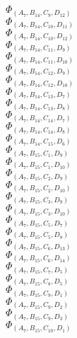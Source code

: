 \documentclass[14pt]{article}
\begin{document}
    $\Phi_{({A}_{7}, {B}_{14}, {C}_{9}, {D}_{12})}$ \\ 
    $\Phi_{({A}_{7}, {B}_{14}, {C}_{10}, {D}_{11})}$ \\ 
    $\Phi_{({A}_{7}, {B}_{14}, {C}_{10}, {D}_{12})}$ \\ 
    $\Phi_{({A}_{7}, {B}_{14}, {C}_{11}, {D}_{9})}$ \\ 
    $\Phi_{({A}_{7}, {B}_{14}, {C}_{11}, {D}_{10})}$ \\ 
    $\Phi_{({A}_{7}, {B}_{14}, {C}_{12}, {D}_{9})}$ \\ 
    $\Phi_{({A}_{7}, {B}_{14}, {C}_{12}, {D}_{10})}$ \\ 
    $\Phi_{({A}_{7}, {B}_{14}, {C}_{13}, {D}_{7})}$ \\ 
    $\Phi_{({A}_{7}, {B}_{14}, {C}_{13}, {D}_{8})}$ \\ 
    $\Phi_{({A}_{7}, {B}_{14}, {C}_{14}, {D}_{7})}$ \\ 
    $\Phi_{({A}_{7}, {B}_{14}, {C}_{14}, {D}_{8})}$ \\ 
    $\Phi_{({A}_{7}, {B}_{14}, {C}_{15}, {D}_{6})}$ \\ 
    $\Phi_{({A}_{7}, {B}_{15}, {C}_{1}, {D}_{9})}$ \\ 
    $\Phi_{({A}_{7}, {B}_{15}, {C}_{1}, {D}_{10})}$ \\ 
    $\Phi_{({A}_{7}, {B}_{15}, {C}_{2}, {D}_{9})}$ \\ 
    $\Phi_{({A}_{7}, {B}_{15}, {C}_{2}, {D}_{10})}$ \\ 
    $\Phi_{({A}_{7}, {B}_{15}, {C}_{3}, {D}_{9})}$ \\ 
    $\Phi_{({A}_{7}, {B}_{15}, {C}_{3}, {D}_{10})}$ \\ 
    $\Phi_{({A}_{7}, {B}_{15}, {C}_{5}, {D}_{7})}$ \\ 
    $\Phi_{({A}_{7}, {B}_{15}, {C}_{5}, {D}_{8})}$ \\ 
    $\Phi_{({A}_{7}, {B}_{15}, {C}_{6}, {D}_{13})}$ \\ 
    $\Phi_{({A}_{7}, {B}_{15}, {C}_{6}, {D}_{14})}$ \\ 
    $\Phi_{({A}_{7}, {B}_{15}, {C}_{7}, {D}_{5})}$ \\ 
    $\Phi_{({A}_{7}, {B}_{15}, {C}_{8}, {D}_{5})}$ \\ 
    $\Phi_{({A}_{7}, {B}_{15}, {C}_{9}, {D}_{1})}$ \\ 
    $\Phi_{({A}_{7}, {B}_{15}, {C}_{9}, {D}_{2})}$ \\ 
    $\Phi_{({A}_{7}, {B}_{15}, {C}_{9}, {D}_{3})}$ \\ 
    $\Phi_{({A}_{7}, {B}_{15}, {C}_{10}, {D}_{1})}$ \\ 
\end{document}
